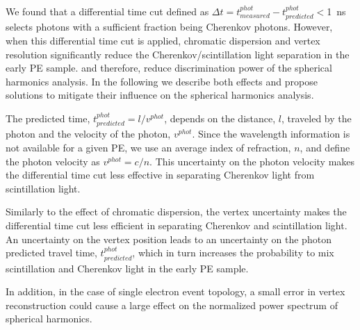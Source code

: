 We found that a differential time cut defined as $\Delta t=t^{phot}_{measured} - t^{phot}_{predicted}<$1~ns selects photons with a 
sufficient fraction being Cherenkov photons. However, when this differential time cut is applied, 
chromatic dispersion and vertex resolution significantly reduce the Cherenkov/scintillation light separation in the early PE sample.
and therefore, reduce discrimination power of the spherical harmonics analysis. In the following we describe both effects and 
propose solutions to mitigate their influence on the spherical harmonics analysis.

The predicted time, 
$t^{phot}_{predicted}=l/v^{phot}$, depends on the distance, $l$, traveled by the photon and the velocity of the photon, 
$v^{phot}$.  Since the wavelength information is not available for a given PE, we use an average index of refraction, $n$, 
and define the photon velocity as $v^{phot} = c/n$. This uncertainty on the photon velocity makes the differential time cut less 
effective in separating Cherenkov light from scintillation light. 



Similarly to the effect of chromatic 
dispersion, the vertex uncertainty makes the differential time cut less efficient in separating Cherenkov and scintillation light. 
An uncertainty on the vertex position leads to an uncertainty on the photon predicted travel time, $t^{phot}_{predicted}$, which in turn
increases the probability to mix scintillation and Cherenkov light in the early PE sample.

In addition, in the case of single electron event topology, a small error in vertex reconstruction could cause a large effect on the 
normalized power spectrum of spherical harmonics.

